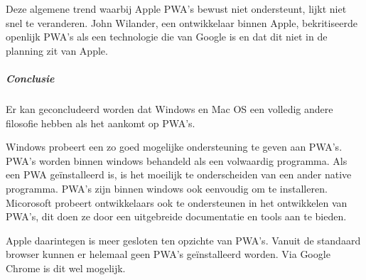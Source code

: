 	Deze algemene trend waarbij Apple PWA's bewust niet ondersteunt, lijkt niet snel te veranderen. John Wilander, een ontwikkelaar binnen Apple, bekritiseerde openlijk PWA's als een technologie die van Google is en dat dit niet in de planning zit van Apple. 
	\autocite{Wilander2019}
	
	
	\subparagraph{Conclusie}
	Er kan geconcludeerd worden dat Windows en Mac OS een volledig andere filosofie hebben als het aankomt op PWA's. 
	
	Windows probeert een zo goed mogelijke ondersteuning te geven aan PWA's. PWA's worden binnen windows behandeld als een volwaardig programma. Als een PWA geïnstalleerd is, is het moeilijk te onderscheiden van een ander native programma.
	PWA's zijn binnen windows ook eenvoudig om te installeren.
	Micorosoft probeert ontwikkelaars ook te ondersteunen in het ontwikkelen van PWA's, dit doen ze door een uitgebreide documentatie en tools aan te bieden.
	
	Apple daarintegen is meer gesloten ten opzichte van PWA's. Vanuit de standaard browser kunnen er helemaal geen PWA's geïnstalleerd worden. Via Google Chrome is dit wel mogelijk.
	